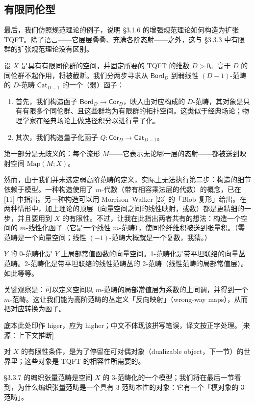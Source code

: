 \subsection{有限同伦型}

最后，我们仿照规范理论的例子，说明 §3.1.6 的增强规范理论如何构造为扩张 TQFT。除了语言——它层层叠叠、充满各阶态射——之外，这与 §3.3.3 中有限群的扩张规范理论没有区别。

设 $X$ 是具有有限同伦群的空间，并固定所要的 TQFT 的维数 $D>0$。高于 $D$ 的同伦群不起作用，将被截断。我们分两步寻求从 $\mathsf{Bord}_D$ 到弱线性 $(D-1)$-范畴的 $D$-范畴 $\mathsf{Cat}_{D-1}$ 的一个（弱）函子：
\begin{enumerate}[label=(\roman*), leftmargin=2.2em, itemsep=0.15em]
\item 首先，我们构造函子 $\mathsf{Bord}_D\to\mathsf{Cor}_D$，映入由对应构成的 $D$-范畴，其对象是只有有限多个同伦群、且这些群均为有限群的拓扑空间。这类似于经典场论；物理学家在经典场论上做路径积分以进行量子化。
\item 其次，我们构造量子化函子 $Q\colon\mathsf{Cor}_D\to\mathsf{Cat}_{D-1}$。
\end{enumerate}

第一部分是无歧义的：每个流形 $M$——它表示无论哪一层的态射——都被送到映射空间 $\mathrm{Map}(M;X)$。

然而，由于我们并未选定弱高阶范畴的定义，实际上无法执行第二步：构造的细节依赖于模型。一种构造使用了 $m$-代数（带有相容乘法层的代数）的概念，已在 [11] 中指出。另一种构造可以用 Morrison--Walker [23] 的「Blob 复形」给出。在两种情形中，加上理论的顶层（向量空间之间的线性映射，或数）都是更精细的一步，并且要用到 $X$ 的有限性。不过，让我在此指出两者共有的想法：构造一个空间的 $m$-线性化函子（它是一个线性 $m$-范畴），使同伦纤维积被送到张量积。（零范畴是一个向量空间；线性 $(-1)$-范畴大概就是一个复数，我猜。）

$Y$ 的 0-范畴化是 $Y$ 上局部常值函数的向量空间。1-范畴化是带平坦联络的向量丛范畴。2-范畴化是带平坦联络的线性范畴丛的 2-范畴（线性范畴的局部常值层）。如此等等。

关键观察是：可以定义空间以 $m$-范畴的局部常值层为系数的上同调，并得到一个 $m$-范畴。这让我们能为高阶范畴的丛定义「反向映射」（wrong-way maps），从而把对应转换为函子。\begin{annote}底本此处印作 higer，应为 higher；中文不体现该拼写笔误，译文按正字处理。[来源：上下文推断]\end{annote}对 $X$ 的有限性条件，是为了停留在可对偶对象（dualizable object，下一节）的世界里；这些对象是 TQFT 的相容性所需要的。

§3.3.7 的编织张量范畴是空间 $X$ 的 3-范畴化的一个模型；我们将在最后一节看到，为什么编织张量范畴是一个具有 3-范畴本性的对象：它有一个「模对象的 3-范畴」。
